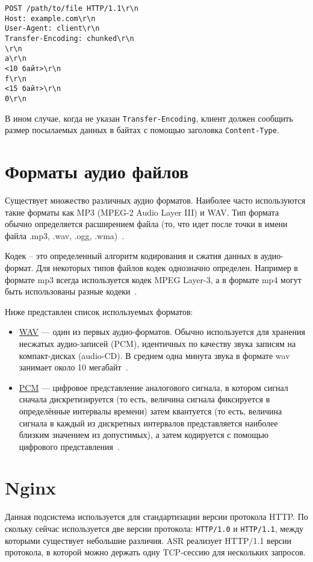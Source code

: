 \begin{lstlisting}[caption={Пример \texttt{Transfer-Encoding: chunked}}, label={lst:http:chunked}]
POST /path/to/file HTTP/1.1\r\n
Host: example.com\r\n
User-Agent: client\r\n
Transfer-Encoding: chunked\r\n
\r\n
a\r\n
<10 байт>\r\n
f\r\n
<15 байт>\r\n
0\r\n
\end{lstlisting}

В ином случае, когда не указан \texttt{Transfer-Encoding}, клиент должен сообщить
размер посылаемых данных в байтах с помощью заголовка \texttt{Content-Type}.

\section{Форматы аудио файлов}
Существует множество различных аудио форматов. Наиболее часто используются такие
форматы как MP3 (MPEG-2 Audio Layer III) и WAV. Тип формата обычно определяется
расширением файла (то, что идет после точки в имени файла .mp3, .wav, .ogg, .wma)~\cite{audio}.

Кодек – это определенный алгоритм кодирования и сжатия данных в аудио-формат.
Для некоторых типов файлов кодек однозначно определен. Например в формате mp3
всегда используется кодек MPEG Layer-3, а в формате mp4 могут быть использованы
разные кодеки~\cite{audio}.

Ниже представлен список используемых форматов:
\begin{itemize}
    \item \hyperlink{wav}{WAV} --– один из первых аудио-форматов. Обычно используется для хранения
    несжатых аудио-записей (PCM), идентичных по качеству звука записям на
    компакт-дисках (audio-CD). В среднем одна минута звука в формате wav занимает
    около 10 мегабайт~\cite{audio}.
    \item \hyperlink{pcm}{PCM} --- цифровое представление аналогового сигнала, в
    котором сигнал сначала дискретизируется (то есть, величина сигнала фиксируется
    в определённые интервалы времени) затем квантуется (то есть, величина сигнала
    в каждый из дискретных интервалов представляется наиболее близким значением из
    допустимых), а затем кодируется с помощью цифрового представления~\cite{pcm}.
\end{itemize}

\section{Nginx}
Данная подсистема используется для стандартизации версии протокола HTTP. По скольку
сейчас используется две версии протокола: \texttt{HTTP/1.0} и \texttt{HTTP/1.1},
между которыми существует небольшие различия. ASR реализует HTTP/1.1 версии протокола,
в которой можно держать одну TCP-сессию для нескольких запросов.

